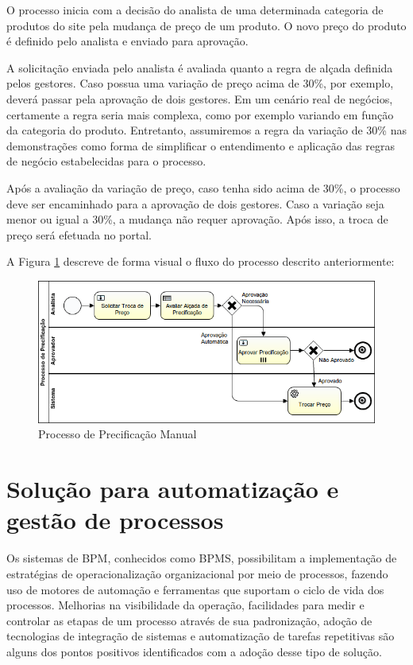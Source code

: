 O processo inicia com a decisão do analista de uma determinada categoria de produtos do site pela mudança de preço de um produto. O novo preço do produto é definido pelo analista e enviado para aprovação.

A solicitação enviada pelo analista é avaliada quanto a regra de alçada definida pelos gestores. Caso possua uma variação de preço acima de 30\%,  por exemplo, deverá passar pela aprovação de dois gestores. Em um cenário real de negócios, certamente a regra seria mais complexa, como por exemplo variando em função da categoria do produto. Entretanto, assumiremos a regra da variação de 30\% nas demonstrações como forma de simplificar o entendimento e aplicação das regras de negócio estabelecidas para o processo.

Após a avaliação da variação de preço, caso tenha sido acima de 30\%, o processo deve ser encaminhado para a aprovação de dois gestores. Caso a variação seja menor ou igual a 30\%, a mudança não requer aprovação. Após isso, a troca de preço será efetuada no portal.

A Figura \ref{fig:exemplo_bpmn-problema} descreve de forma visual o fluxo do processo descrito anteriormente:

\begin{figure}[H]
  \centering
  \includegraphics[width=1.0\textwidth]{imagens/ProcessoDePrecificacao.png}
  \caption{Processo de Precificação Manual}
  \label{fig:exemplo_bpmn-problema}
\end{figure}

\section{Solução para automatização e gestão de processos}\label{sec:introducao-ferramenta}

Os sistemas de BPM\cite{bpm}, conhecidos como BPMS\cite{bpms}, possibilitam a implementação de estratégias de operacionalização organizacional por meio de processos, fazendo uso de motores de automação e ferramentas que suportam o ciclo de vida dos processos. Melhorias na visibilidade da operação, facilidades para medir e controlar as etapas de um processo através de sua padronização, adoção de tecnologias de integração de sistemas e automatização de tarefas repetitivas são alguns dos pontos positivos identificados com a adoção desse tipo de solução.  

